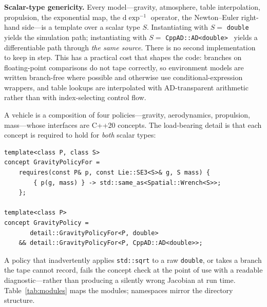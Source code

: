 \documentclass[preprint,12pt,a4paper]{elsarticle}
\newcommand{\dexp}{\mathrm{d}\exp}
\newcommand{\code}[1]{\texttt{\small #1}}
\begin{document}
\textbf{Scalar-type genericity.} Every model---gravity, atmosphere, table
interpolation, propulsion, the exponential map, the $\dexp^{-1}$ operator, the
Newton--Euler right-hand side---is a template over a scalar type $S$.
Instantiating with $S =$ \code{double} yields the simulation path; instantiating
with $S =$ \code{CppAD::AD<double>}~\cite{cppad} yields a differentiable path
through \emph{the same source}. There is no second implementation to keep in
step. This has a practical cost that shapes the code: branches on
floating-point comparisons do not tape correctly, so environment models are
written branch-free where possible and otherwise use conditional-expression
wrappers, and table lookups are interpolated with AD-transparent arithmetic
rather than with index-selecting control flow.

A vehicle is a composition of four policies---gravity, aerodynamics,
propulsion, mass---whose interfaces are C++20 concepts. The load-bearing detail
is that each concept is required to hold for \emph{both} scalar types:

\begin{lstlisting}[caption={Policy concepts are instantiated for \code{double} and for the AD type, so a model that is not differentiable is a compile error rather than a wrong Jacobian at run time.}, label={lst:concepts}]
template<class P, class S>
concept GravityPolicyFor =
    requires(const P& p, const Lie::SE3<S>& g, S mass) {
        { p(g, mass) } -> std::same_as<Spatial::Wrench<S>>;
    };

template<class P>
concept GravityPolicy =
       detail::GravityPolicyFor<P, double>
    && detail::GravityPolicyFor<P, CppAD::AD<double>>;
\end{lstlisting}

A policy that inadvertently applies \code{std::sqrt} to a raw \code{double}, or
takes a branch the tape cannot record, fails the concept check at the point of
use with a readable diagnostic---rather than producing a silently wrong
Jacobian at run time. Table~\ref{tab:modules} maps the modules; namespaces
mirror the directory structure.
\end{document}
